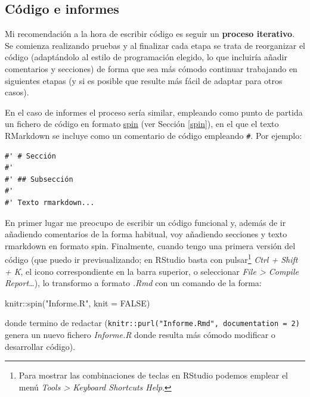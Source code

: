 \documentclass[
]{book}
\newenvironment{Shaded}{\begin{snugshade}}{\end{snugshade}}
\newcommand{\AttributeTok}[1]{\textcolor[rgb]{0.77,0.63,0.00}{#1}}
\newcommand{\ConstantTok}[1]{\textcolor[rgb]{0.00,0.00,0.00}{#1}}
\newcommand{\FunctionTok}[1]{\textcolor[rgb]{0.00,0.00,0.00}{#1}}
\newcommand{\NormalTok}[1]{#1}
\newcommand{\SpecialCharTok}[1]{\textcolor[rgb]{0.00,0.00,0.00}{#1}}
\newcommand{\StringTok}[1]{\textcolor[rgb]{0.31,0.60,0.02}{#1}}
\theoremstyle{break}
\theoremstyle{nonumberplain}
\begin{document}
\hypertarget{codigo}{%
\subsection{Código e informes}\label{codigo}}

Mi recomendación a la hora de escribir código es seguir un \textbf{proceso iterativo}.
Se comienza realizando pruebas y al finalizar cada etapa se trata de reorganizar el código (adaptándolo al estilo de programación elegido, lo que incluiría añadir comentarios y secciones) de forma que sea más cómodo continuar trabajando en siguientes etapas (y si es posible que resulte más fácil de adaptar para otros casos).

En el caso de informes el proceso sería similar, empleando como punto de partida un fichero de código en formato \href{https://yihui.org/knitr/demo/stitch/\#spin-comment-out-texts}{spin} (ver Sección \ref{spin}), en el que el texto RMarkdown se incluye como un comentario de código empleando \texttt{\#\textquotesingle{}}.
Por ejemplo:

\begin{verbatim}
#' # Sección
#'
#' ## Subsección
#'
#' Texto rmarkdown...
\end{verbatim}

En primer lugar me preocupo de escribir un código funcional y, además de ir añadiendo comentarios de la forma habitual, voy añadiendo secciones y texto rmarkdown en formato spin.
Finalmente, cuando tengo una primera versión del código (que puedo ir previsualizando; en RStudio basta con pulsar\footnote{Para mostrar las combinaciones de teclas en RStudio podemos emplear el menú \emph{Tools \textgreater{} Keyboard Shortcuts Help}.} \emph{Ctrl + Shift + K}, el icono correspondiente en la barra superior, o seleccionar \emph{File \textgreater{} Compile Report\ldots{}}), lo transformo a formato \emph{.Rmd} con un comando de la forma:

\begin{Shaded}
\begin{Highlighting}[]
\NormalTok{knitr}\SpecialCharTok{::}\FunctionTok{spin}\NormalTok{(}\StringTok{"Informe.R"}\NormalTok{, }\AttributeTok{knit =} \ConstantTok{FALSE}\NormalTok{)}
\end{Highlighting}
\end{Shaded}

donde termino de redactar (\texttt{knitr::purl("Informe.Rmd",\ documentation\ =\ 2)} genera un nuevo fichero \emph{Informe.R} donde resulta más cómodo modificar o desarrollar código).
\end{document}
